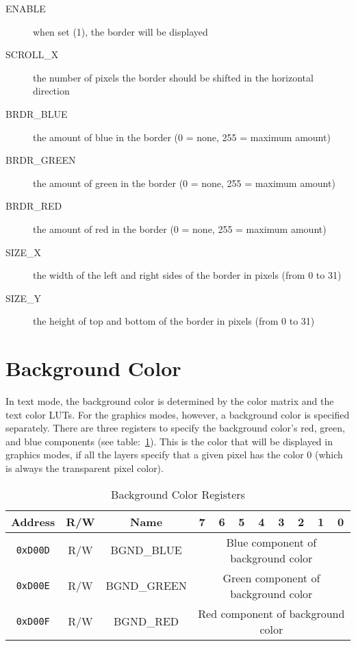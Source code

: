 \begin{description}
    \item[ENABLE] when set (1), the border will be displayed

    \item[SCROLL\_X] the number of pixels the border should be shifted in the horizontal direction

    \item[BRDR\_BLUE] the amount of blue in the border (0 = none, 255 = maximum amount)

    \item[BRDR\_GREEN] the amount of green in the border (0 = none, 255 = maximum amount)

    \item[BRDR\_RED] the amount of red in the border (0 = none, 255 = maximum amount)

    \item[SIZE\_X] the width of the left and right sides of the border in pixels (from 0 to 31)

    \item[SIZE\_Y] the height of top and bottom of the border in pixels (from 0 to 31)
\end{description}

\section*{Background Color}

In text mode, the background color is determined by the color matrix and the text color LUTs. For the graphics modes, however, a background color is specified separately. There are three registers to specify the background color's red, green, and blue components (see table:~\ref{tab:back_reg}). This is the color that will be displayed in graphics modes, if all the layers specify that a given pixel has the color 0 (which is always the transparent pixel color).

\begin{table}[ht]
    \begin{center}
        \begin{tabular}{|c|c|c|c|c|c|c|c|c|c|c|} \hline
            Address & R/W & Name & 7 & 6 & 5 & 4 & 3 & 2 & 1 & 0 \\\hline\hline
            \verb+0xD00D+ & R/W & BGND\_BLUE & \multicolumn{8}{|c|}{Blue component of background color} \\ \hline
            \verb+0xD00E+ & R/W & BGND\_GREEN & \multicolumn{8}{|c|}{Green component of background color} \\ \hline
            \verb+0xD00F+ & R/W & BGND\_RED & \multicolumn{8}{|c|}{Red component of background color} \\ \hline
        \end{tabular}
    \end{center}
    \caption{Background Color Registers}
    \label{tab:back_reg}
\end{table}

